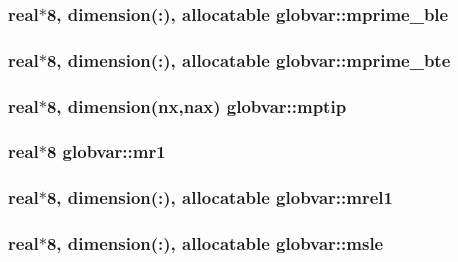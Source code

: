 \subsubsection[{mprime\+\_\+ble}]{\setlength{\rightskip}{0pt plus 5cm}real$\ast$8, dimension(\+:), allocatable globvar\+::mprime\+\_\+ble}\label{namespaceglobvar_ae10e04d6629f2c844f1e0613142003da}
\hypertarget{namespaceglobvar_a6efd6498d9aae9dcb41000cdd23ddf73}{}
\subsubsection[{mprime\+\_\+bte}]{\setlength{\rightskip}{0pt plus 5cm}real$\ast$8, dimension(\+:), allocatable globvar\+::mprime\+\_\+bte}\label{namespaceglobvar_a6efd6498d9aae9dcb41000cdd23ddf73}
\hypertarget{namespaceglobvar_a31a35cf7209d884eb1891745486853f5}{}
\subsubsection[{mptip}]{\setlength{\rightskip}{0pt plus 5cm}real$\ast$8, dimension({\bf nx},{\bf nax}) globvar\+::mptip}\label{namespaceglobvar_a31a35cf7209d884eb1891745486853f5}
\hypertarget{namespaceglobvar_aef87425714082b77e0f5f6fce2787666}{}
\subsubsection[{mr1}]{\setlength{\rightskip}{0pt plus 5cm}real$\ast$8 globvar\+::mr1}\label{namespaceglobvar_aef87425714082b77e0f5f6fce2787666}
\hypertarget{namespaceglobvar_a0678586794cf430f0626766f74f99789}{}
\subsubsection[{mrel1}]{\setlength{\rightskip}{0pt plus 5cm}real$\ast$8, dimension(\+:), allocatable globvar\+::mrel1}\label{namespaceglobvar_a0678586794cf430f0626766f74f99789}
\hypertarget{namespaceglobvar_a5aa8f63b0ed7052d09ff37dd0a505100}{}
\subsubsection[{msle}]{\setlength{\rightskip}{0pt plus 5cm}real$\ast$8, dimension(\+:), allocatable globvar\+::msle}\label{namespaceglobvar_a5aa8f63b0ed7052d09ff37dd0a505100}
\hypertarget{namespaceglobvar_ab5a7740414d3a3f3b79672f336f4ed83}{}
